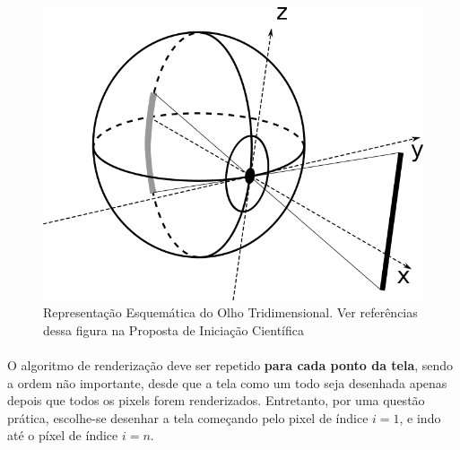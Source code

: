 \documentclass{article}
\begin{document}
	\begin{figure}[h]
		\centering
		\includegraphics[scale=0.5]{3D-Eye-no-legend}
		\caption{Representação Esquemática do Olho Tridimensional. Ver referências dessa figura na Proposta de Iniciação Científica}
		\label{fig:Olho3D}
	\end{figure}
	
	\paragraph{}
	O algoritmo de renderização deve ser repetido \textbf{para cada ponto da tela}, sendo a ordem não importante, desde que a tela como um todo seja desenhada apenas depois que todos os pixels forem renderizados. Entretanto, por uma questão prática, escolhe-se desenhar a tela começando pelo pixel de índice $i=1$, e indo até o píxel de índice $i=n$.
	
\end{document}

